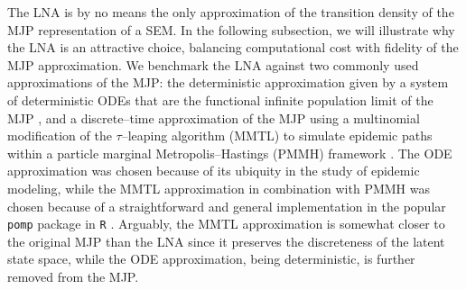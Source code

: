 The LNA is by no means the only approximation of the transition density of the MJP representation of a SEM. In the following subsection, we will illustrate why the LNA is an attractive choice, balancing computational cost with fidelity of the MJP approximation. We benchmark the LNA against two commonly used approximations of the MJP: the deterministic approximation given by a system of deterministic ODEs that are the functional infinite population limit of the MJP \cite{fuchs2013inference}, and a discrete--time approximation of the MJP using a multinomial modification of the $ \tau $--leaping algorithm (MMTL) \cite{breto2011compound} to simulate epidemic paths within a particle marginal Metropolis--Hastings (PMMH) framework \cite{andrieu2010particle}. The ODE approximation was chosen because of its ubiquity in the study of epidemic modeling, while the MMTL approximation in combination with PMMH was chosen because of a straightforward and general implementation in the popular \texttt{pomp} package in \texttt{R} \cite{pompjss}. Arguably, the MMTL approximation is somewhat closer to the original MJP than the LNA since it preserves the discreteness of the latent state space, while the ODE approximation, being deterministic, is further removed from the MJP.

